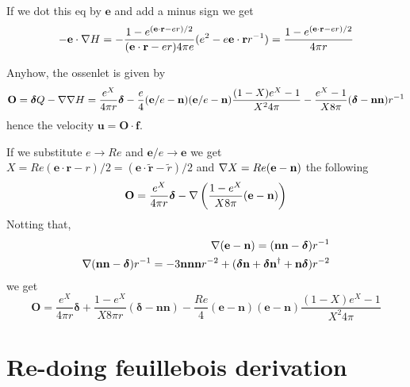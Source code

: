 If we dot this eq by $\textbf{e}$ and add a minus sign we get
\begin{equation}
     - \textbf{e}\cdot \mathbf{\nabla} H
    = -\frac{1 - e^{(\textbf{e}\cdot \textbf{r} -e r)/2}}{(\textbf{e}\cdot \textbf{r} -e r) 4 \pi e} (e^2 - e \textbf{e}\cdot \textbf{r}r^{-1})
    = \frac{1 - e^{(\textbf{e}\cdot \textbf{r} -e r)/2}}{4 \pi r}
\end{equation}


Anyhow, the ossenlet is given by
\begin{equation}
    \textbf{O} = \bm\delta Q - \mathbf{\nabla}\mathbf{\nabla} H
    =
    \frac{e^X}{4\pi r}\bm\delta
    -
    \frac{e}{4}(\textbf{e}/e - \textbf{n})
    (\textbf{e}/e - \textbf{n})
    \frac{(1-X) e^X - 1}{X^2 4 \pi}
    - \frac{e^X- 1}{X 8 \pi }  (\bm\delta  - \textbf{nn} )r^{-1}
\end{equation}
hence the velocity $\textbf{u}=\textbf{O}\cdot \textbf{f}$.


If we substitute $e \to Re$ and $\textbf{e}/e \to \textbf{e}$ we get $X = Re(\textbf{e}\cdot \textbf{r} - r)/2 = (\textbf{e}\cdot \widetilde{\textbf{r} }- \widetilde{r})/2  $ and $\mathbf{\nabla} X = Re (\textbf{e} - \textbf{n})$ the following
\begin{align}
    \textbf{O}
    &=
    \frac{e^X}{4\pi r}\bm\delta
    -\mathbf{\nabla} \left(\frac{1-e^X}{X8\pi}(\textbf{e}- \textbf{n})\right)\\
\end{align}
Notting that,
\begin{align}
    \mathbf{\nabla} (\textbf{e}- \textbf{n}) = (\textbf{nn} - \bm\delta ) r^{-1}\\
    \mathbf{\nabla} (\textbf{nn} - \bm\delta ) r^{-1} = - 3 \textbf{nnn} r^{-2} + (\bm\delta \textbf{n}+ \bm\delta \textbf{n}^\dagger + \textbf{n}\bm\delta) r^{-2}
\end{align}
we get
\begin{equation}
    \textbf{O} =
    \frac{e^X}{4\pi r}\bm\delta
    + \frac{1 - e^X}{X 8 \pi r}  (\bm\delta  - \textbf{nn} )
    -
    \frac{Re}{4}(\textbf{e} - \textbf{n})
    (\textbf{e} - \textbf{n})
    \frac{(1-X) e^X - 1}{X^2 4 \pi}
\end{equation}


\section{Re-doing feuillebois derivation}

